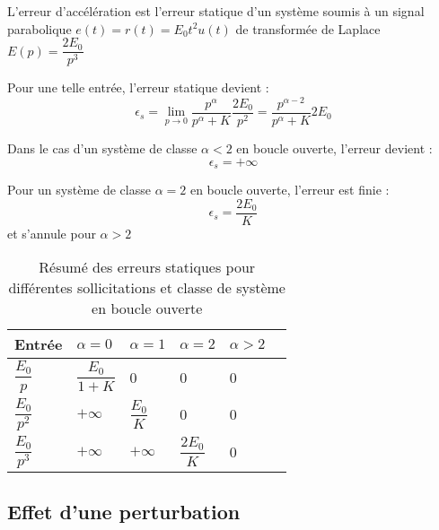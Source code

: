 L'erreur d'accélération est l'erreur statique d'un système soumis à un signal
parabolique $e(t)=r(t)=E_0t^2 u(t)$ de transformée de Laplace $E(p)=\dfrac{2E_0}{p^3}$

Pour une telle entrée, l'erreur statique devient :
$$
\epsilon_s=\lim\limits_{p\to 0} \dfrac{p^\alpha}{p^\alpha+K}\dfrac{2E_0}{p^2}=\dfrac{p^{\alpha-2}}{p^\alpha+K}2E_0 
$$

Dans le cas d'un système de classe $\alpha<2$ en boucle ouverte, l'erreur devient :
$$
\epsilon_s=+\infty
$$

Pour un système de classe $\alpha=2$ en boucle ouverte, l'erreur est finie :
$$
\epsilon_s=\dfrac{2E_0}{K}
$$
et s'annule pour $\alpha>2$

\begin{table}
	\centering
\begin{tabular}{M{2cm}M{2cm}M{2cm}M{2cm}M{2cm}N}
	\hline
	Entrée & $\alpha=0$ & $\alpha=1$ & $\alpha=2$ & $\alpha>2$ & \\[2em]
	\hline
	$\dfrac{E_0}{p}$   &  $\dfrac{E_0}{1+K}$ & 0                & 0                 & 0 & \\[2em]
	$\dfrac{E_0}{p^2}$ &  $+\infty$          & $\dfrac{E_0}{K}$ & 0                 & 0 & \\[2em]
	$\dfrac{E_0}{p^3}$ &  $+\infty$          & $+\infty$        & $\dfrac{2E_0}{K}$ & 0 & \\[2em]
	\hline
\end{tabular}
	\caption{Résumé des erreurs statiques pour différentes sollicitations et 
	classe de système en boucle ouverte}
\end{table}

\subsection{Effet d'une perturbation}

\begin{center}                                                                                                                
\end{center}                                                                                                                  

